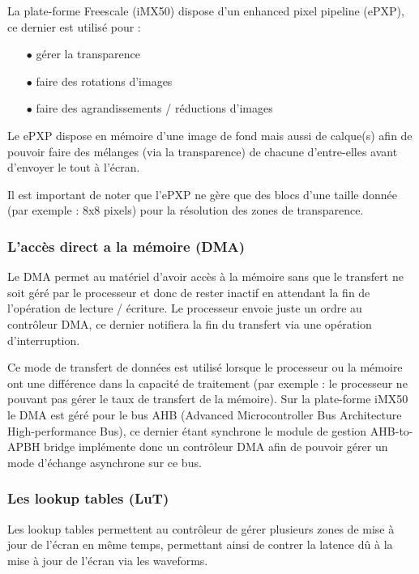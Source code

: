 La plate-forme Freescale (iMX50) dispose d'un enhanced pixel pipeline (ePXP), ce dernier est utilisé pour : 
	\begin{itemize}
		\item[$\bullet$] gérer la transparence
		\item[$\bullet$] faire des rotations d'images
		\item[$\bullet$] faire des agrandissements / réductions d'images\\
	\end{itemize}

Le ePXP dispose en mémoire d'une image de fond mais aussi de calque(s) afin de pouvoir faire des 
mélanges (via la transparence) de chacune d'entre-elles avant d'envoyer le tout à l'écran.

Il est important de noter que l'ePXP ne gère que des blocs d'une taille donnée (par exemple : 8x8 pixels) pour la résolution des zones de transparence.

\subsubsection{L'accès direct a la mémoire (DMA)}

Le DMA permet au matériel d'avoir accès à la mémoire sans que le transfert ne soit géré par le processeur et donc de rester inactif en attendant la fin de l'opération de lecture / écriture.
Le processeur envoie juste un ordre au contrôleur DMA, ce dernier notifiera la fin du transfert via une opération d'interruption.

Ce mode de transfert de données est utilisé lorsque le processeur ou la mémoire ont une différence dans la capacité de traitement (par exemple : le processeur ne pouvant pas gérer le taux de transfert de la mémoire).
Sur la plate-forme iMX50 le DMA est géré pour le bus AHB (Advanced Microcontroller Bus Architecture High-performance Bus), ce dernier étant synchrone le module de gestion AHB-to-APBH bridge implémente donc un contrôleur DMA afin de pouvoir gérer un mode d'échange asynchrone sur ce bus.

\subsubsection{Les lookup tables (LuT)}

Les lookup tables permettent au contrôleur de gérer plusieurs zones de mise à jour de l'écran en même temps, permettant ainsi de contrer la latence dû à la mise à jour de l'écran via les waveforms.


